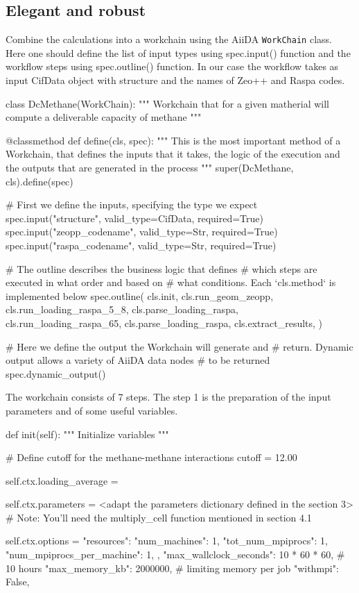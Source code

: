 \documentclass[twoside,a4paper,11pt]{extarticle}
\begin{document}
\subsection{Elegant and robust}

Combine the calculations into a workchain using the AiiDA \verb|WorkChain| class. Here one should define the list of input types using spec.input() function and the workflow steps using spec.outline() function. In our case the workflow takes as input CifData object with structure and the names of Zeo++ and Raspa codes. 
\begin{pythoncommand}
class DcMethane(WorkChain):
    """
    Workchain that for a given matherial will compute a deliverable capacity of methane
    """

    @classmethod
    def define(cls, spec):
        """
        This is the most important method of a Workchain, that defines the
        inputs that it takes, the logic of the execution and the outputs
        that are generated in the process 
        """
        super(DcMethane, cls).define(spec)
        
        # First we define the inputs, specifying the type we expect
        spec.input("structure", valid_type=CifData, required=True)
        spec.input("zeopp_codename", valid_type=Str, required=True)
        spec.input("raspa_codename", valid_type=Str, required=True)

        
        # The outline describes the business logic that defines
        # which steps are executed in what order and based on
        # what conditions. Each `cls.method` is implemented below
        spec.outline(
            cls.init,
            cls.run_geom_zeopp,
            cls.run_loading_raspa_5_8,
            cls.parse_loading_raspa,
            cls.run_loading_raspa_65,
            cls.parse_loading_raspa,
            cls.extract_results,
        )
        
        # Here we define the output the Workchain will generate and
        # return. Dynamic output allows a variety of AiiDA data nodes
        # to be returned
        spec.dynamic_output()
\end{pythoncommand}

The workchain consists of 7 steps. The step 1 is the preparation of the input parameters and of some useful variables. 
\begin{pythoncommand}
def init(self):
    """
    Initialize variables
    """

    # Define cutoff for the methane-methane interactions
    cutoff = 12.00

    self.ctx.loading_average = {}

    self.ctx.parameters = {<adapt the parameters dictionary defined in the section 3>}
    # Note: You'll need the multiply_cell function mentioned in section 4.1

    self.ctx.options = {
        "resources": {
            "num_machines": 1,
            "tot_num_mpiprocs": 1,
            "num_mpiprocs_per_machine": 1,
        },
        "max_wallclock_seconds": 10 * 60 * 60, # 10 hours
        "max_memory_kb": 2000000, # limiting memory per job
        "withmpi": False,
    }
\end{pythoncommand}
\end{document}
